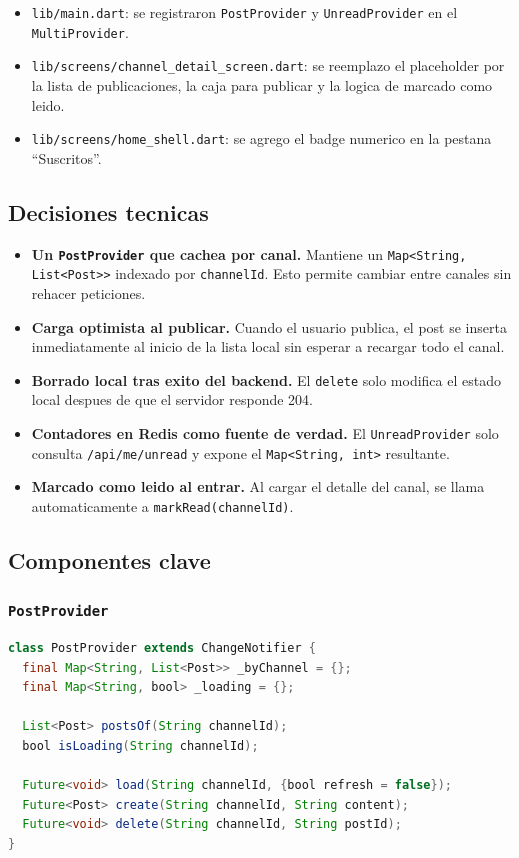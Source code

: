\begin{itemize}[leftmargin=*]
  \item \texttt{lib/main.dart}: se registraron \texttt{PostProvider} y \texttt{UnreadProvider} en el \texttt{MultiProvider}.
  \item \texttt{lib/screens/channel\_detail\_screen.dart}: se reemplazo el placeholder por la lista de publicaciones, la caja para publicar y la logica de marcado como leido.
  \item \texttt{lib/screens/home\_shell.dart}: se agrego el badge numerico en la pestana ``Suscritos''.
\end{itemize}

\subsection{Decisiones tecnicas}

\begin{itemize}[leftmargin=*]
  \item \textbf{Un \texttt{PostProvider} que cachea por canal.} Mantiene un \texttt{Map<String, List<Post>>} indexado por \texttt{channelId}. Esto permite cambiar entre canales sin rehacer peticiones.
  \item \textbf{Carga optimista al publicar.} Cuando el usuario publica, el post se inserta inmediatamente al inicio de la lista local sin esperar a recargar todo el canal.
  \item \textbf{Borrado local tras exito del backend.} El \texttt{delete} solo modifica el estado local despues de que el servidor responde 204.
  \item \textbf{Contadores en Redis como fuente de verdad.} El \texttt{UnreadProvider} solo consulta \texttt{/api/me/unread} y expone el \texttt{Map<String, int>} resultante.
  \item \textbf{Marcado como leido al entrar.} Al cargar el detalle del canal, se llama automaticamente a \texttt{markRead(channelId)}.
\end{itemize}

\subsection{Componentes clave}

\subsubsection{\texttt{PostProvider}}

\begin{lstlisting}[language=Java]
class PostProvider extends ChangeNotifier {
  final Map<String, List<Post>> _byChannel = {};
  final Map<String, bool> _loading = {};

  List<Post> postsOf(String channelId);
  bool isLoading(String channelId);

  Future<void> load(String channelId, {bool refresh = false});
  Future<Post> create(String channelId, String content);
  Future<void> delete(String channelId, String postId);
}
\end{lstlisting}

